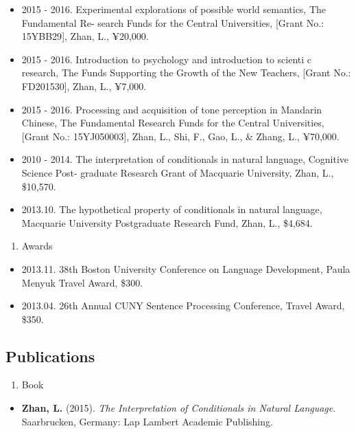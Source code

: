 \documentclass[10pt,]{article}
\providecommand{\tightlist}{%
  \setlength{\itemsep}{0pt}\setlength{\parskip}{0pt}}
\begin{document}
\begin{itemize}
\item
  2015 - 2016. Experimental explorations of possible world semantics,
  The Fundamental Re- search Funds for the Central Universities,
  {[}Grant No.: 15YBB29{]}, Zhan, L., ¥20,000.
\item
  2015 - 2016. Introduction to psychology and introduction to scienti c
  research, The Funds Supporting the Growth of the New Teachers,
  {[}Grant No.: FD201530{]}, Zhan, L., ¥7,000.
\item
  2015 - 2016. Processing and acquisition of tone perception in Mandarin
  Chinese, The Fundamental Research Funds for the Central Universities,
  {[}Grant No.: 15YJ050003{]}, Zhan, L., Shi, F., Gao, L., \& Zhang, L.,
  ¥70,000.
\item
  2010 - 2014. The interpretation of conditionals in natural language,
  Cognitive Science Post- graduate Research Grant of Macquarie
  University, Zhan, L., \$10,570.
\item
  2013.10. The hypothetical property of conditionals in natural
  language, Macquarie University Postgraduate Research Fund, Zhan, L.,
  \$4,684.
\end{itemize}

\begin{enumerate}
\def\labelenumi{\arabic{enumi}.}
\setcounter{enumi}{1}
\tightlist
\item
  Awards
\end{enumerate}

\begin{itemize}
\item
  2013.11. 38th Boston University Conference on Language Development,
  Paula Menyuk Travel Award, \$300.
\item
  2013.04. 26th Annual CUNY Sentence Processing Conference, Travel
  Award, \$350.
\end{itemize}

\hypertarget{publications}{%
\subsection{Publications}\label{publications}}

\begin{enumerate}
\def\labelenumi{\arabic{enumi}.}
\tightlist
\item
  Book
\end{enumerate}

\begin{itemize}
\tightlist
\item
  \textbf{Zhan, L.} (2015). \emph{The Interpretation of Conditionals in
  Natural Language}. Saarbrucken, Germany: Lap Lambert Academic
  Publishing.
\end{itemize}
\end{document}
